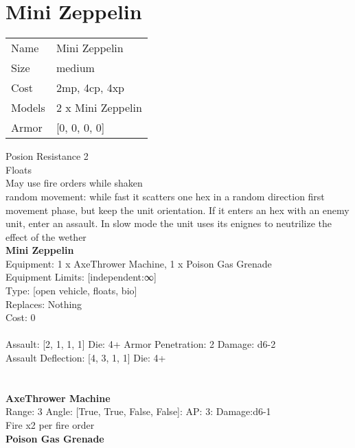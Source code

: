 \pagebreak\pagebreak

\section{ Mini Zeppelin }

\begin{tabular}{ll}
  Name & Mini Zeppelin \\
  Size & medium\\
  Cost & 2mp, 4cp, 4xp\\
  Models & 2 x Mini Zeppelin\\
  Armor & [0, 0, 0, 0]\\
\end{tabular}

\noindent Posion Resistance 2\\ 
Floats\\ 
May use fire orders while shaken\\ 
random movement: while fast it scatters one hex in a random direction first movement phase, but keep the unit orientation. If it enters an hex with an enemy unit, enter an assault. In slow mode the unit uses its enignes to neutrilize the effect of the wether\\ 


{\bf Mini Zeppelin } \\
Equipment: 1 x AxeThrower Machine, 1 x Poison Gas Grenade \\
Equipment Limits: [independent:∞] \\
Type: [open vehicle, floats, bio] \\
Replaces: Nothing \\
Cost: 0\\
\ \\
Assault: [2, 1, 1, 1] Die: 4+ Armor Penetration: 2 Damage: d6-2 \\
Assault Deflection: [4, 3, 1, 1] Die: 4+\\
\indent  
\ \\

\ \\
{\bf AxeThrower Machine } \\



Range: 3  Angle: [True, True, False, False]: AP: 3: Damage:d6-1 \\
Fire x2 per fire order\\ 




{\bf Poison Gas Grenade } \\



